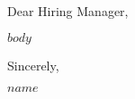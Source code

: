 \documentclass[$fontsize$, a4paper]{article}
\begin{document}
\noindent Dear Hiring Manager,

$body$

\noindent Sincerely,

$name$
\end{document}
